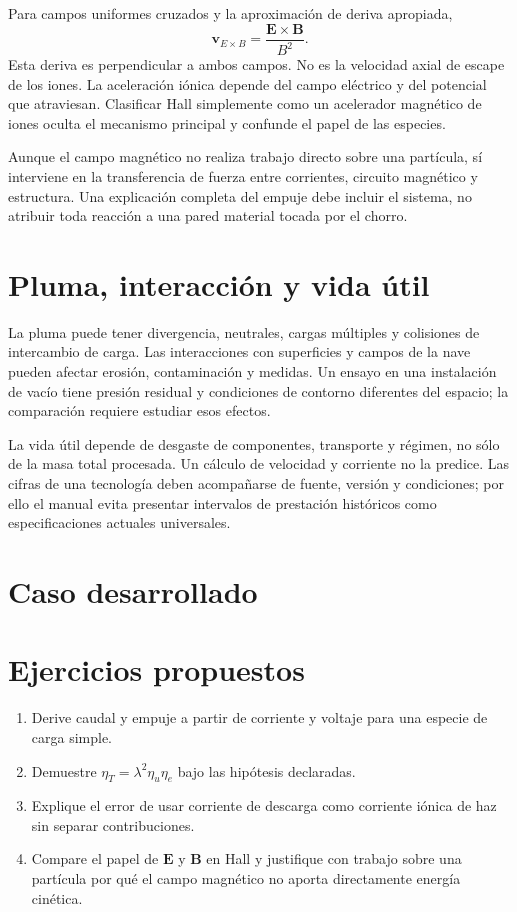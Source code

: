 Para campos uniformes cruzados y la aproximación de deriva apropiada,
\[
 \mathbf v_{E\times B}=\frac{\mathbf E\times\mathbf B}{B^2}.
\]
Esta deriva es perpendicular a ambos campos. No es la velocidad axial de escape de los iones. La aceleración iónica depende del campo eléctrico y del potencial que atraviesan. Clasificar Hall simplemente como un acelerador magnético de iones oculta el mecanismo principal y confunde el papel de las especies.\cite{JPL-EP}

Aunque el campo magnético no realiza trabajo directo sobre una partícula, sí interviene en la transferencia de fuerza entre corrientes, circuito magnético y estructura. Una explicación completa del empuje debe incluir el sistema, no atribuir toda reacción a una pared material tocada por el chorro.
\section{Pluma, interacción y vida útil}
La pluma puede tener divergencia, neutrales, cargas múltiples y colisiones de intercambio de carga. Las interacciones con superficies y campos de la nave pueden afectar erosión, contaminación y medidas. Un ensayo en una instalación de vacío tiene presión residual y condiciones de contorno diferentes del espacio; la comparación requiere estudiar esos efectos.

La vida útil depende de desgaste de componentes, transporte y régimen, no sólo de la masa total procesada. Un cálculo de velocidad y corriente no la predice. Las cifras de una tecnología deben acompañarse de fuente, versión y condiciones; por ello el manual evita presentar intervalos de prestación históricos como especificaciones actuales universales.
\section{Caso desarrollado}

\section{Ejercicios propuestos}
\begin{enumerate}
\item Derive caudal y empuje a partir de corriente y voltaje para una especie de carga simple.
\item Demuestre $\eta_T=\lambda^2\eta_u\eta_e$ bajo las hipótesis declaradas.
\item Explique el error de usar corriente de descarga como corriente iónica de haz sin separar contribuciones.
\item Compare el papel de $\mathbf E$ y $\mathbf B$ en Hall y justifique con trabajo sobre una partícula por qué el campo magnético no aporta directamente energía cinética.
\end{enumerate}


\studiumchaptercheck
